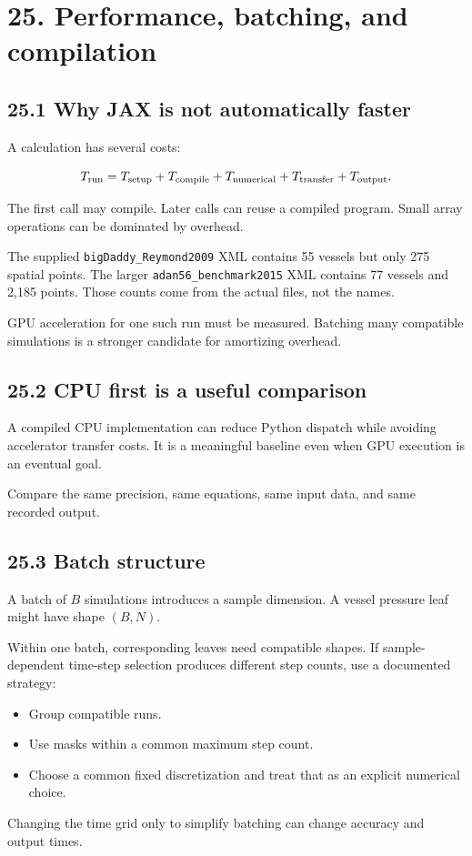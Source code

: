 \documentclass[11pt,a4paper]{article}
\begin{document}
\clearpage
\section{25. Performance, batching, and compilation}
\subsection{25.1 Why JAX is not automatically faster}
A calculation has several costs:


\begingroup\small
\[
T_{\rm run}
=
T_{\rm setup}+T_{\rm compile}
+T_{\rm numerical}
+T_{\rm transfer}
+T_{\rm output}.
\]
\endgroup


The first call may compile. Later calls can reuse a compiled program. Small array operations can be dominated by overhead.

The supplied \texttt{bigDaddy\_\allowbreak{}Reymond2009} XML contains 55 vessels but only 275 spatial points. The larger \texttt{adan56\_\allowbreak{}benchmark2015} XML contains 77 vessels and 2,185 points. Those counts come from the actual files, not the names.

GPU acceleration for one such run must be measured. Batching many compatible simulations is a stronger candidate for amortizing overhead.

\subsection{25.2 CPU first is a useful comparison}
A compiled CPU implementation can reduce Python dispatch while avoiding accelerator transfer costs. It is a meaningful baseline even when GPU execution is an eventual goal.

Compare the same precision, same equations, same input data, and same recorded output.

\subsection{25.3 Batch structure}
A batch of \(B\) simulations introduces a sample dimension. A vessel pressure leaf might have shape \((B,N)\).

Within one batch, corresponding leaves need compatible shapes. If sample-dependent time-step selection produces different step counts, use a documented strategy:


\begin{itemize}
\item Group compatible runs.


\item Use masks within a common maximum step count.


\item Choose a common fixed discretization and treat that as an explicit numerical choice.


\end{itemize}
Changing the time grid only to simplify batching can change accuracy and output times.
\end{document}
